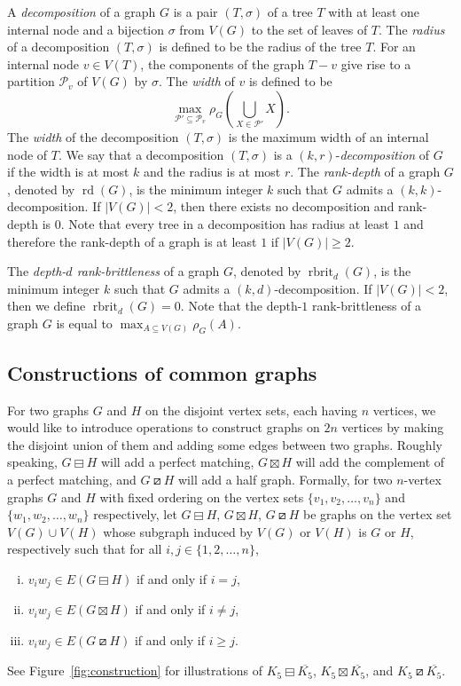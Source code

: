 \documentclass[11pt]{article}
\newcommand\abs[1]{\lvert #1\rvert}
\newcommand\mat{\boxminus}
\newcommand\tri{\boxslash}
\newcommand\antimat{\boxtimes}
\def\K_#1{{K_{#1}}}
\def\S_#1{\overline{K_{#1}}}
\newcommand\cutrk{\rho}
\newcommand\rd{\operatorname{rd}}
\newcommand\rbrit{\operatorname{rbrit}}
\begin{document}
A \emph{decomposition} of a  graph $G$  is 
a pair $(T,\sigma)$ of a tree $T$ with at least one internal node and a bijection $\sigma$ from $V(G)$ to the set of leaves of $T$.
The \emph{radius} of a decomposition $(T,\sigma)$ 
is defined to be the radius of the tree $T$. 
For an internal node $v \in V(T)$, the components of the graph $T - v$ give rise to a partition $\mathcal P_v$ of $V(G)$ by $\sigma$. 
The \emph{width} of $v$ is defined to be 
\[\max_{ \mathcal{P'} \subseteq \mathcal P_v } \cutrk_G \left( \bigcup_{X \in \mathcal{P'} } X \right).\]
The \emph{width} of the decomposition $(T,\sigma)$ is the maximum width of an internal node of $T$.
We say that a decomposition $(T, \sigma)$ is a $(k,r)$-\emph{decomposition} of $G$
if the width is at most $k$ and the radius is at most $r$. 
The \emph{rank-depth} of a graph $G$, denoted by $\rd(G)$, is the minimum integer $k$ such that 
$G$ admits a $(k, k)$-decomposition.
If $\abs{V(G)}<2$, then there exists no decomposition and rank-depth is $0$.
Note that every tree in a decomposition has radius at least $1$ and therefore
the rank-depth of a graph is at least $1$ if $\abs{V(G)}\ge 2$.


The \emph{depth-$d$ rank-brittleness} of a graph $G$,
denoted by $\rbrit_d(G)$, is the minimum integer $k$
such that $G$ admits a $(k,d)$-decomposition.
If $\abs{V(G)}<2$, then we define $\rbrit_d(G)=0$.
Note that the depth-$1$ rank-brittleness of a graph $G$
is equal to $\max_{A\subseteq V(G)} \rho_G(A)$.	


\subsection{Constructions of common graphs}
For two graphs $G$ and $H$ on the disjoint vertex sets, each having $n$ vertices, we would like
to introduce operations to construct  graphs on $2n$ vertices by making the disjoint
union of them and adding some edges between two graphs. 
Roughly speaking, $G\mat H$ will add a perfect matching,
 $G\antimat H$ will add the complement of a perfect matching, 
 and $G\tri H$ will add a half graph.
Formally, 
for two $n$-vertex graphs $G$ and $H$ with fixed ordering on the vertex sets $\{v_1,v_2,\ldots,v_n\}$ and $\{w_1, w_2, \ldots, w_n\}$ respectively, 
let 
$G\mat H$, $G\antimat H$, $G\tri H$
be graphs on the vertex set $V(G)\cup V(H)$ 
whose subgraph induced by $V(G)$ or $V(H)$
is $G$ or $H$, respectively
such that
 for all $i,j\in \{1,2,\ldots,n\}$, 
\begin{enumerate}[(i)]
%
%
%
%
\item 
$v_iw_j\in E(G\mat H)$ if and only if $i=j$,
%
%
%
%
\item 
$v_iw_j\in E(G\antimat H)$ if and only if $i\neq j$,
%
%
%
%
\item 
$v_iw_j\in E(G\tri H)$ if and only if $i\ge j$.
\end{enumerate}
See Figure~\ref{fig:construction} for illustrations of $\K_5\mat\S_5$, $\K_5\antimat\S_5$, and $\K_5\tri \S_5$.
\end{document}
